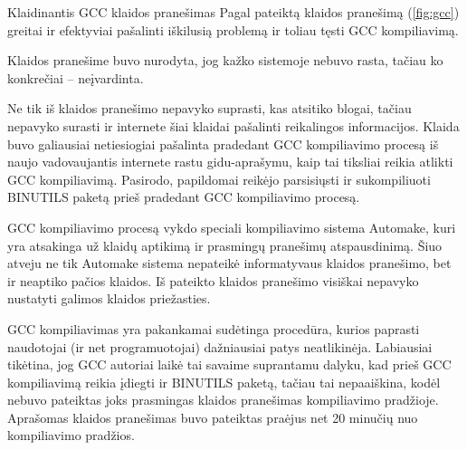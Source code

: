 \begin{xcase}{Klaidinantis GCC klaidos pranešimas}
  \xcgoal
  {
    Pagal pateiktą klaidos pranešimą (\ref{fig:gcc}) greitai ir efektyviai pašalinti iškilusią problemą ir
    toliau tęsti GCC kompiliavimą.
  }
  
  \xctools
  {
    Klaidos pranešime buvo nurodyta, jog kažko sistemoje nebuvo rasta, tačiau ko konkrečiai – 
    neįvardinta.
  }
  
  \xcresult
  {
    Ne tik iš klaidos pranešimo nepavyko suprasti, kas atsitiko blogai, tačiau nepavyko 
    surasti ir internete šiai klaidai pašalinti reikalingos informacijos.
    Klaida buvo galiausiai netiesiogiai pašalinta pradedant GCC kompiliavimo procesą iš naujo
    vadovaujantis internete rastu gidu-aprašymu, kaip tai tiksliai reikia atlikti GCC kompiliavimą. 
    Pasirodo, papildomai reikėjo parsisiųsti ir sukompiliuoti BINUTILS paketą prieš pradedant GCC 
    kompiliavimo procesą.
  }
  
  \xcprinciples
  {
    {
      GCC kompiliavimo procesą vykdo speciali kompiliavimo sistema Automake, kuri yra atsakinga
      už klaidų aptikimą ir prasmingų pranešimų atspausdinimą. Šiuo atveju ne tik Automake 
      sistema nepateikė informatyvaus klaidos pranešimo, bet ir neaptiko pačios klaidos.
    }
    {
      Iš pateikto klaidos pranešimo visiškai nepavyko nustatyti galimos klaidos priežasties.
    }
  }
  
  \xcthoughts
  {
    GCC kompiliavimas yra pakankamai sudėtinga procedūra, kurios
    paprasti naudotojai (ir net programuotojai) dažniausiai patys
    neatlikinėja. Labiausiai tikėtina, jog GCC autoriai laikė tai
    savaime suprantamu dalyku, kad prieš GCC kompiliavimą reikia
    įdiegti ir BINUTILS paketą, tačiau tai nepaaiškina, kodėl
    nebuvo pateiktas joks prasmingas klaidos pranešimas kompiliavimo
    pradžioje. Aprašomas klaidos pranešimas buvo pateiktas praėjus
    net 20 minučių nuo kompiliavimo pradžios.
  }
\end{xcase}
